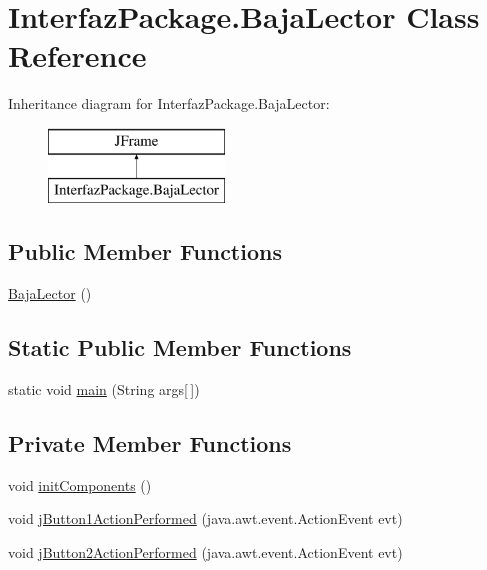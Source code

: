 \hypertarget{class_interfaz_package_1_1_baja_lector}{}\section{Interfaz\+Package.\+Baja\+Lector Class Reference}
\label{class_interfaz_package_1_1_baja_lector}
Inheritance diagram for Interfaz\+Package.\+Baja\+Lector\+:\begin{figure}[H]
\begin{center}
\leavevmode
\includegraphics[height=2.000000cm]{class_interfaz_package_1_1_baja_lector}
\end{center}
\end{figure}
\subsection*{Public Member Functions}
\begin{DoxyCompactItemize}
\item 
\mbox{\hyperlink{class_interfaz_package_1_1_baja_lector_a524ec2212ed63f49b7de4c5743319766}{Baja\+Lector}} ()
\end{DoxyCompactItemize}
\subsection*{Static Public Member Functions}
\begin{DoxyCompactItemize}
\item 
static void \mbox{\hyperlink{class_interfaz_package_1_1_baja_lector_ae8d95711504ca7f87351202627520f94}{main}} (String args\mbox{[}$\,$\mbox{]})
\end{DoxyCompactItemize}
\subsection*{Private Member Functions}
\begin{DoxyCompactItemize}
\item 
void \mbox{\hyperlink{class_interfaz_package_1_1_baja_lector_a667facb9f42b9567bb69750de89e74ea}{init\+Components}} ()
\item 
void \mbox{\hyperlink{class_interfaz_package_1_1_baja_lector_a7ebc81bebee5f75046ff282093b4fb16}{j\+Button1\+Action\+Performed}} (java.\+awt.\+event.\+Action\+Event evt)
\item 
void \mbox{\hyperlink{class_interfaz_package_1_1_baja_lector_a68ce955ddab00f21a3fe2f7aa43f098d}{j\+Button2\+Action\+Performed}} (java.\+awt.\+event.\+Action\+Event evt)
\end{DoxyCompactItemize}
